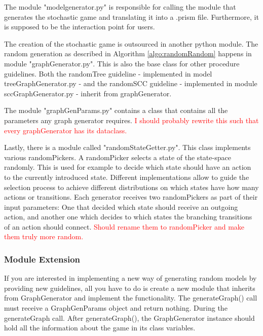 The module "modelgenerator.py" is responsible for calling the module that generates the stochastic game and translating it into a .prism file. 
Furthermore, it is supposed to be the interaction point for users.

The creation of the stochastic game is outsourced in another python module. The random generation as described in Algorithm \ref{algo:randomRandom} happens in
module "graphGenerator.py". This is also the base class for other procedure guidelines. 
Both the randomTree guideline - implemented in model treeGraphGenerator.py - and the randomSCC guideline - implemented in module sccGraphGenerator.py - inherit
from graphGenerator.

The module "graphGenParams.py" contains a class that contains all the parameters any graph generator requires. 
\textcolor{red}{I should probably rewrite this such that every graphGenerator has its dataclass.}

Lastly, there is a module called "randomStateGetter.py". This class implements various randomPickers.
A randomPicker selects a state of the state-space randomly.
This is used for example to decide which state should have an action to the currently introduced state.
Different implementations allow to guide the selection process to achieve different distributions on which states have how many actions or transitions.
Each generator receives two randomPickers as part of their input parameters: One that decided which state should receive an outgoing action, 
and another one which decides to which states the branching transitions of an action should connect.
\textcolor{red}{Should rename them to randomPicker and make them truly more random.}

\subsubsection*{Module Extension}
If you are interested in implementing a new way of generating random models by providing new guidelines, all you have to do is create a new
module that inherits from GraphGenerator and implement the functionality. The generateGraph() call must receive a GraphGenParams object and return nothing.
During the generateGraph call. After generateGraph(), the GraphGenerator instance should hold all the information about the game in its class variables.